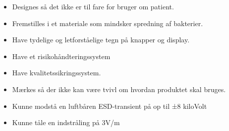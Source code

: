\begin{itemize}
\item Designes så det ikke er til fare for bruger om patient. 
\item Fremstilles i et materiale som mindsker spredning af bakterier. 
\item Have tydelige og letforståelige tegn på knapper og display.
\item Have et risikohåndteringssystem
\item Have kvalitetssikringssystem. 
\item Mærkes så der ikke kan være tvivl om hvordan produktet skal bruges.
\item Kunne modstå en luftbåren ESD-transient på op til ±8 kiloVolt
\item Kunne tåle en indstråling på 3V/m
\end{itemize}